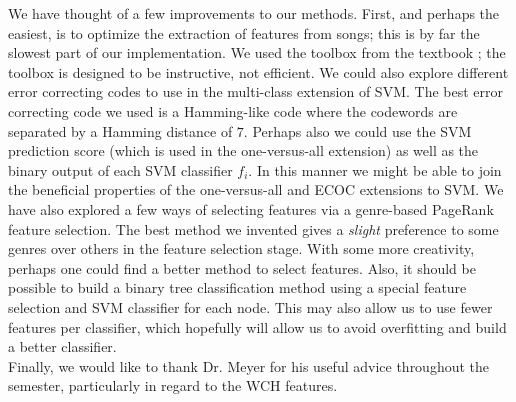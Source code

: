 \documentclass[12pt]{article}
\begin{document}
We have thought of a few improvements to our methods.  First, and perhaps the easiest, is to optimize the extraction of features from songs; this is by far the slowest part of our implementation.  We used the toolbox from the textbook \cite{lerch:aca}; the toolbox is designed to be instructive, not efficient.  We could also explore different error correcting codes to use in the multi-class extension of SVM.  The best error correcting code we used is a Hamming-like code where the codewords are separated by a Hamming distance of $7$.  Perhaps also we could use the SVM prediction score (which is used in the one-versus-all extension) as well as the binary output of each SVM classifier $f_i$.  In this manner we might be able to join the beneficial properties of the one-versus-all and ECOC extensions to SVM.  We have also explored a few ways of selecting features via a genre-based PageRank feature selection.  The best method we invented gives a \emph{slight} preference to some genres over others in the feature selection stage.  With some more creativity, perhaps one could find a better method to select features.  Also, it should be possible to build a binary tree classification method using a special feature selection and SVM classifier for each node.  This may also allow us to use fewer features per classifier, which hopefully will allow us to avoid overfitting and build a better classifier.\\

Finally, we would like to thank Dr. Meyer for his useful advice throughout the semester, particularly in regard to the WCH features.



\end{document}
